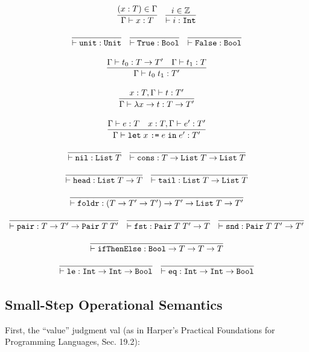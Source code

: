 \documentclass[10pt]{article}
\newcommand{\ttt}[1]{\texttt{#1}}
\newcommand{\ra}{\ensuremath{\rightarrow}}
\newcommand{\Int}{\ttt{Int}}
\newcommand{\Bool}{\ttt{Bool}}
\newcommand{\tyPair}{\ttt{Pair}}
\newcommand{\List}{\ttt{List}}
\newcommand{\letbnd}{\ttt{let}}
\newcommand{\inexpr}{\ttt{in}}
\begin{document}
\[
  \begin{array}{cc}
    \infer{\Gamma \vdash x : T}{(x : T) \in \Gamma}
    ~~~
    \infer{\vdash i : \ttt{Int}}{i \in \mathbb{Z}}
    \\\\
    \infer{\vdash \ttt{unit} : \ttt{Unit}}{}
    ~~~
    \infer{\vdash \ttt{True} : \ttt{Bool}}{}
    ~~~
    \infer{\vdash \ttt{False} : \ttt{Bool}}{}
    \\\\
    \infer{\Gamma \vdash t_0\; t_1 : T'}{\Gamma \vdash t_0 : T \ra T' & \Gamma \vdash t_1 : T}
    \\\\
    \infer{\Gamma \vdash \lambda x \ra t : T \ra T'}{x : T, \Gamma \vdash t : T'}
    \\\\
    \infer{\Gamma \vdash \letbnd\; x\; \ttt{:=}\; e\; \inexpr\; e' : T'}{\Gamma \vdash e : T & x : T, \Gamma \vdash e' : T'}
    \\\\
    \infer{\vdash \ttt{nil} : \List\; T}{}
    ~~~
    \infer{\vdash \ttt{cons} : T \ra \List\; T \ra \List\; T}{}
    \\\\
    \infer{\vdash \ttt{head} : \List\; T \ra T}{}
    ~~~
    \infer{\vdash \ttt{tail} : \List\; T \ra \List\; T}{}
    \\\\
    \infer{\vdash \ttt{foldr} : (T \ra T' \ra T') \ra T' \ra \List\; T \ra T'}{}
    \\\\
    \infer{\vdash \ttt{pair} : T \ra T' \ra \tyPair\; T\; T'}{}
    ~~~
    \infer{\vdash \ttt{fst} : \tyPair\; T\; T' \ra T}{}
    ~~~
    \infer{\vdash \ttt{snd} : \tyPair\; T\; T' \ra T'}{}
    \\\\
    \infer{\vdash \ttt{ifThenElse} : \Bool \ra T \ra T \ra T}{}
    \\\\
    \infer{\vdash \ttt{le} : \Int \ra \Int \ra \Bool}{}
    ~~~
    \infer{\vdash \ttt{eq} : \Int \ra \Int \ra \Bool}{}
  \end{array}
\]

\subsection{Small-Step Operational Semantics}

First, the ``value'' judgment val (as in Harper's Practical Foundations for Programming Languages, Sec. 19.2):
\end{document}
